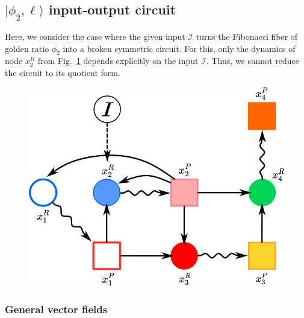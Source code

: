 \subsection{$|\phi_2, \ell \rangle$ input-output circuit}
\label{ssec:broken-fibo}

Here, we consider the case where the given input $\mathcal{I}$
turns the Fibonacci fiber of golden ratio $\phi_2$ into a broken 
symmetric circuit. For this, only the dynamics of node $x_2^R$ 
from Fig.~\ref{fig:broken_fibo} depends explicitly on the 
input $\mathcal{I}$. Thus, we cannot reduce the circuit to its 
quotient form.

\begin{figure}[H]
    \centering
    \includegraphics[scale=0.65]{figs/broken_fibo_1.png}
    \caption{}
    \label{fig:broken_fibo}
\end{figure}

\subsubsection{General vector fields}

